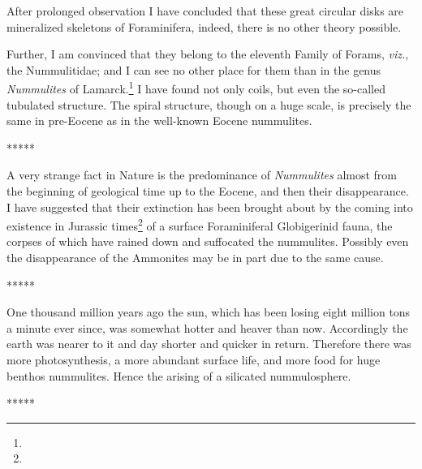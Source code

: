 \documentclass[a4paper, 12pt, oneside]{article}
\begin{document}
After prolonged observation I have concluded that these great circular disks are mineralized skeletons of Foraminifera, indeed, there is no other theory possible.

Further, I am convinced that they belong to the eleventh Family of Forams, \emph{viz.}, the Nummulitidae; and I can see no other place for them than in the genus \emph{Nummulites} of Lamarck.\footnote{} I have found not only coils, but even the so-called tubulated structure. The spiral structure, though on a huge scale, is precisely the same in pre-Eocene as in the well-known Eocene nummulites.

\centerline{*\hspace{15mm}*\hspace{15mm}*\hspace{15mm}*\hspace{15mm}*}
\bigskip

A very strange fact in Nature is the predominance of \emph{Nummulites} almost from the beginning of geological time up to the Eocene, and then their disappearance. I have suggested that their extinction has been brought about by the coming into existence in Jurassic times\footnote{} of a surface Foraminiferal Globigerinid fauna, the corpses of which have rained down and suffocated the nummulites. Possibly even the disappearance of the Ammonites may be in part due to the same cause.

\centerline{*\hspace{15mm}*\hspace{15mm}*\hspace{15mm}*\hspace{15mm}*}
\bigskip

One thousand million years ago the sun, which has been losing eight million tons a minute ever since, was somewhat hotter and heaver than now. Accordingly the earth was nearer to it and day shorter and quicker in return. Therefore there was more photosynthesis, a more abundant surface life, and more food for huge benthos nummulites. Hence the arising of a silicated nummulosphere.

\centerline{*\hspace{15mm}*\hspace{15mm}*\hspace{15mm}*\hspace{15mm}*}
\bigskip
\end{document}
